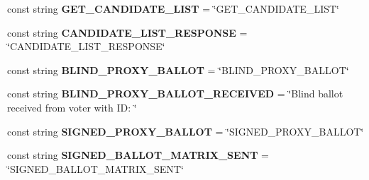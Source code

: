 \begin{DoxyCompactItemize}
\item 
\hypertarget{class_election_authority_1_1_constants_a6bcab0cd9bf03d0e20e585f3080e9557}{}const string {\bfseries G\+E\+T\+\_\+\+C\+A\+N\+D\+I\+D\+A\+T\+E\+\_\+\+L\+I\+S\+T} = \char`\"{}G\+E\+T\+\_\+\+C\+A\+N\+D\+I\+D\+A\+T\+E\+\_\+\+L\+I\+S\+T\char`\"{}\label{class_election_authority_1_1_constants_a6bcab0cd9bf03d0e20e585f3080e9557}

\item 
\hypertarget{class_election_authority_1_1_constants_a53cf9a84bfae1ba52085d2a8c556e683}{}const string {\bfseries C\+A\+N\+D\+I\+D\+A\+T\+E\+\_\+\+L\+I\+S\+T\+\_\+\+R\+E\+S\+P\+O\+N\+S\+E} = \char`\"{}C\+A\+N\+D\+I\+D\+A\+T\+E\+\_\+\+L\+I\+S\+T\+\_\+\+R\+E\+S\+P\+O\+N\+S\+E\char`\"{}\label{class_election_authority_1_1_constants_a53cf9a84bfae1ba52085d2a8c556e683}

\item 
\hypertarget{class_election_authority_1_1_constants_ac05b304ec6ab025cb539fd21609cd5a8}{}const string {\bfseries B\+L\+I\+N\+D\+\_\+\+P\+R\+O\+X\+Y\+\_\+\+B\+A\+L\+L\+O\+T} = \char`\"{}B\+L\+I\+N\+D\+\_\+\+P\+R\+O\+X\+Y\+\_\+\+B\+A\+L\+L\+O\+T\char`\"{}\label{class_election_authority_1_1_constants_ac05b304ec6ab025cb539fd21609cd5a8}

\item 
\hypertarget{class_election_authority_1_1_constants_af63b0c36b4ecc49583ab084d861a4e8d}{}const string {\bfseries B\+L\+I\+N\+D\+\_\+\+P\+R\+O\+X\+Y\+\_\+\+B\+A\+L\+L\+O\+T\+\_\+\+R\+E\+C\+E\+I\+V\+E\+D} = \char`\"{}Blind ballot received from voter with I\+D\+: \char`\"{}\label{class_election_authority_1_1_constants_af63b0c36b4ecc49583ab084d861a4e8d}

\item 
\hypertarget{class_election_authority_1_1_constants_af112ec6083e9fa13bd2266f0e66ecd4d}{}const string {\bfseries S\+I\+G\+N\+E\+D\+\_\+\+P\+R\+O\+X\+Y\+\_\+\+B\+A\+L\+L\+O\+T} = \char`\"{}S\+I\+G\+N\+E\+D\+\_\+\+P\+R\+O\+X\+Y\+\_\+\+B\+A\+L\+L\+O\+T\char`\"{}\label{class_election_authority_1_1_constants_af112ec6083e9fa13bd2266f0e66ecd4d}

\item 
\hypertarget{class_election_authority_1_1_constants_ae6bb23eaf3057e69dbc0451bbec0072b}{}const string {\bfseries S\+I\+G\+N\+E\+D\+\_\+\+B\+A\+L\+L\+O\+T\+\_\+\+M\+A\+T\+R\+I\+X\+\_\+\+S\+E\+N\+T} = \char`\"{}S\+I\+G\+N\+E\+D\+\_\+\+B\+A\+L\+L\+O\+T\+\_\+\+M\+A\+T\+R\+I\+X\+\_\+\+S\+E\+N\+T\char`\"{}\label{class_election_authority_1_1_constants_ae6bb23eaf3057e69dbc0451bbec0072b}


\end{DoxyCompactItemize}
